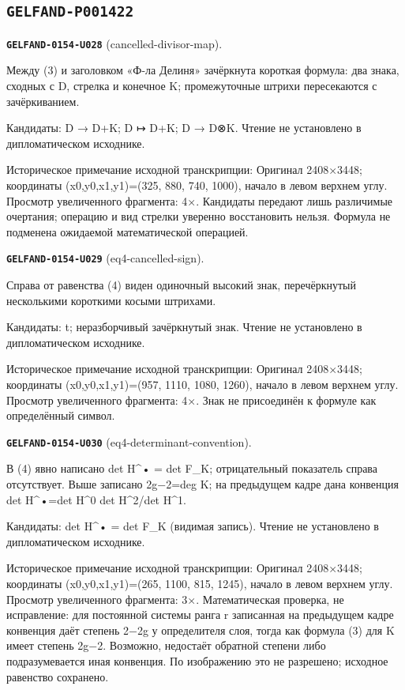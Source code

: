 \subsection*{\texttt{GELFAND-P001422}}
\par\noindent\leavevmode{}\label{GELFAND-0154-U028}\textbf{\texttt{GELFAND-0154-U028}} (cancelled-divisor-map).\nopagebreak[4]\par
Между (3) и заголовком «Ф-ла Делиня» зачёркнута короткая формула: два знака, сходных с D, стрелка и конечное K; промежуточные штрихи пересекаются с зачёркиванием.\par
Кандидаты: D → D+K; D ↦ D+K; D → D⊗K. Чтение не установлено в дипломатическом исходнике.\par
Историческое примечание исходной транскрипции: Оригинал 2408×3448; координаты (x0,y0,x1,y1)=(325, 880, 740, 1000), начало в левом верхнем углу. Просмотр увеличенного фрагмента: 4×. Кандидаты передают лишь различимые очертания; операцию и вид стрелки уверенно восстановить нельзя. Формула не подменена ожидаемой математической операцией.\par\medskip
\par\noindent\leavevmode{}\label{GELFAND-0154-U029}\textbf{\texttt{GELFAND-0154-U029}} (eq4-cancelled-sign).\nopagebreak[4]\par
Справа от равенства (4) виден одиночный высокий знак, перечёркнутый несколькими короткими косыми штрихами.\par
Кандидаты: t; неразборчивый зачёркнутый знак. Чтение не установлено в дипломатическом исходнике.\par
Историческое примечание исходной транскрипции: Оригинал 2408×3448; координаты (x0,y0,x1,y1)=(957, 1110, 1080, 1260), начало в левом верхнем углу. Просмотр увеличенного фрагмента: 4×. Знак не присоединён к формуле как определённый символ.\par\medskip
\par\noindent\leavevmode{}\label{GELFAND-0154-U030}\textbf{\texttt{GELFAND-0154-U030}} (eq4-determinant-convention).\nopagebreak[4]\par
В (4) явно написано det H\textasciicircum{}• = det F\_K; отрицательный показатель справа отсутствует. Выше записано 2g−2=deg K; на предыдущем кадре дана конвенция det H\textasciicircum{}•=det H\textasciicircum{}0 det H\textasciicircum{}2/det H\textasciicircum{}1.\par
Кандидаты: det H\textasciicircum{}• = det F\_K (видимая запись). Чтение не установлено в дипломатическом исходнике.\par
Историческое примечание исходной транскрипции: Оригинал 2408×3448; координаты (x0,y0,x1,y1)=(265, 1100, 815, 1245), начало в левом верхнем углу. Просмотр увеличенного фрагмента: 3×. Математическая проверка, не исправление: для постоянной системы ранга r записанная на предыдущем кадре конвенция даёт степень 2−2g у определителя слоя, тогда как формула (3) для K имеет степень 2g−2. Возможно, недостаёт обратной степени либо подразумевается иная конвенция. По изображению это не разрешено; исходное равенство сохранено.\par\medskip

